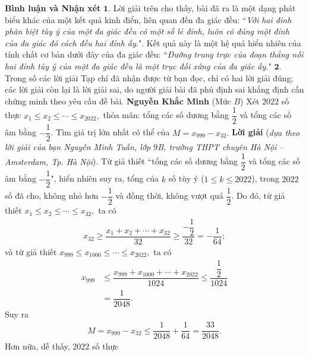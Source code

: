 \begin{multicols}{2}
	\vskip 0.05cm
	\textbf{\color{thachthuctoanhoc}Bình luận và Nhận xét}
	\vskip 0.05cm
	$\pmb{1.}$ Lời giải trên cho thấy, bài đã ra là một dạng phát biểu khác của một kết quả kinh điển, liên quan đến đa giác đều: ``\textit{Với hai đỉnh phân biệt tùy ý của một đa giác đều có một số lẻ đỉnh, luôn có đúng một đỉnh của đa giác đó cách đều hai đỉnh ấy.}". Kết quả này là một hệ quả hiển nhiên của tính chất cơ bản dưới đây của đa giác đều:
	\vskip 0.05cm
	``\textit{Đường trung trực của đoạn thẳng nối hai đỉnh tùy ý của một đa giác đều là một trục đối xứng của đa giác ấy.}"
	\vskip 0.05cm
	$\pmb{2.}$ Trong số các lời giải Tạp chí đã nhận được từ bạn đọc, chỉ có hai lời giải đúng; các lời giải còn lại là lời giải sai, do người giải bài đã phủ định sai khẳng định cần chứng minh theo yêu cầu đề bài.
	\vskip 0.05cm
	\hfill\textbf{\color{thachthuctoanhoc}Nguyễn Khắc Minh}
	\vskip 0.1cm
	{}
	(Mức $B$)
	Xét $2022$ số thực ${x_1} \le {x_2} \le  \cdots  \le {x_{2022}},$  thỏa mãn: tổng các số dương bằng $\dfrac{1}{2}$  và tổng các số âm bằng $-\dfrac{1}{2}$. Tìm giá trị lớn nhất có thể của $M = {x_{999}} - {x_{32}}.$
	\vskip 0.05cm 
	\textbf{\color{thachthuctoanhoc}Lời giải} (\textit{dựa theo lời giải của bạn Nguyễn Minh Tuấn, lớp $9$B, trường THPT chuyên Hà Nội -- Amsterdam, Tp. Hà Nội}).
	\vskip 0.05cm
	Từ giả thiết ``tổng các số dương bằng $\dfrac{1}{2}$ và tổng các số âm bằng $-\dfrac{1}{2}$", hiển nhiên suy ra, tổng của $k$ số tùy ý ($1 \le k \le 2022$), trong $2022$ số đã cho, không nhỏ hơn $-\dfrac{1}{2}$ và đồng thời, không vượt quá $\dfrac{1}{2}$.
	\vskip 0.05cm
	Do đó, từ giả thiết ${x_1} \le {x_2} \le  \cdots  \le {x_{32}},$ ta có
	\begin{align*}
		{x_{32}} \ge \dfrac{{{x_1} + {x_2} +  \cdots  + {x_{32}}}}{{32}} \ge \dfrac{{ - \dfrac{1}{2}}}{{32}} =  - \dfrac{1}{{64}};
	\end{align*}
	và từ giả thiết  ${x_{999}} \le {x_{1000}} \le  \cdots  \le {x_{2022}},$ ta có
	\begin{align*}
		{x_{999}} &\le \dfrac{{{x_{999}} + {x_{1000}} +  \cdots  + {x_{2022}}}}{{1024}} \le \dfrac{{\dfrac{1}{2}}}{{1024}}\\[-0.7ex]
		 &= \dfrac{1}{{2048}}.
	\end{align*}
	Suy ra
	\begin{align*}
		M = {x_{999}} - {x_{32}} \le \dfrac{1}{{2048}} + \dfrac{1}{{64}} = \dfrac{{33}}{{2048}}.
	\end{align*}
	Hơn nữa, dễ thấy, $2022$ số thực
	\begin{align*}

\end{align*}
\end{multicols}
